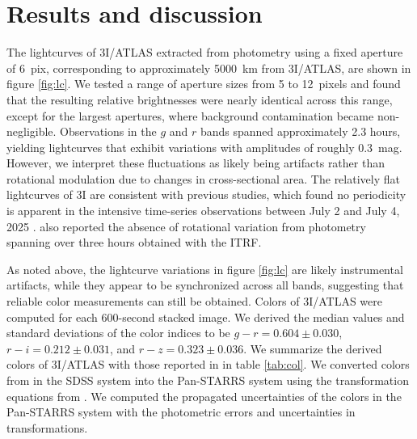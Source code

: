 \documentclass[]{pasj02}
\newcommand\I{3I/ATLAS\xspace}
\newcommand\gr{$g-r=0.604\pm0.030$\xspace}
\newcommand\ri{$r-i=0.212\pm0.031$\xspace}
\newcommand\rz{$r-z=0.323\pm0.036$\xspace}
\begin{document}
\section{Results and discussion}\label{sec:res}
The lightcurves of \I extracted from photometry using a fixed aperture of 6~pix, corresponding to approximately 5000~km from \I, are shown in figure \ref{fig:lc}.
We tested a range of aperture sizes from 5 to 12~pixels and found that the resulting relative brightnesses were nearly identical across this range, except for the largest apertures, where background contamination became non-negligible.
Observations in the $g$ and $r$ bands spanned approximately 2.3 hours, yielding lightcurves that exhibit variations with amplitudes of roughly 0.3~mag.
However, we interpret these fluctuations as likely being artifacts rather than rotational modulation due to changes in cross-sectional area.
The relatively flat lightcurves of 3I are consistent with previous studies, which found no periodicity is apparent in the intensive time-series observations between July 2 and July 4, 2025 \citep{Seligman2025_3I}. 
\citep{Kareta2025_3I} also reported the absence of rotational variation from photometry spanning over three hours obtained with the ITRF.

As noted above, the lightcurve variations in figure \ref{fig:lc} are likely
instrumental artifacts, while they appear to be synchronized across all bands, suggesting that reliable color measurements can still be obtained.
Colors of \I were computed for each 600-second stacked image.
We derived the median values and standard deviations of the color indices to be \gr, \ri, and \rz.
We summarize the derived colors of \I with those reported in \citet{Bolin2025_3I} in table \ref{tab:col}.
We converted colors from \citet{Bolin2025_3I} in the SDSS system into the Pan-STARRS system using the transformation equations from \cite{Tonry2012}.
We computed the propagated uncertainties of the colors in the Pan-STARRS system with the photometric errors and uncertainties in transformations.
\end{document}
